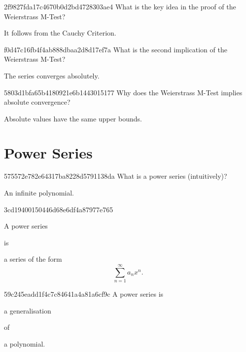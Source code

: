\begin{note}{2f9827fda17c4670b0d2bd4728303ae4}
    What is the key idea in the proof of the Weierstrass M-Test?

    \begin{cloze}{1}
        It follows from the Cauchy Criterion.
    \end{cloze}
\end{note}

\begin{note}{f0d47c16fb4f4ab888dbaa2d8d17ef7a}
    What is the second implication of the Weierstrass M-Test?

    \begin{cloze}{1}
        The series converges absolutely.
    \end{cloze}
\end{note}

\begin{note}{5803d1bfa65b4180921e6b1443015177}
    Why does the Weierstrass M-Test implies absolute convergence?

    \begin{cloze}{1}
        Absolute values have the same upper bounds.
    \end{cloze}
\end{note}

\section{Power Series} %
\begin{note}{575572e782e64317ba8228d5791138da}
    What is a power series (intuitively)?

    \begin{cloze}{1}
        An infinite polynomial.
    \end{cloze}
\end{note}

\begin{note}{3cd19400150446d68e6df4a87977e765}
    \begin{icloze}{2}A power series\end{icloze} is
    \begin{icloze}{1}
        a series of the form
        \[
            \sum_{n=1}^{\infty} a_n x^{n}.
        \]
    \end{icloze}
\end{note}

\begin{note}{59c245eadd1f4c7c84641a4a81a6cf9c}
    A power series is \begin{icloze}{2}a generalisation\end{icloze} of \begin{icloze}{1}a polynomial.\end{icloze}
\end{note}

